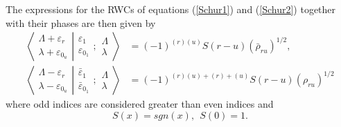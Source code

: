 \documentclass[12pt]{article}
\begin{document}
The expressions for the RWCs of equations (\ref{Schur1}) and (\ref{Schur2}) together with their phases \cite{GIW2,GIW3} are then given by
\begin{align*}
\left\langle\left. 
\begin{array}{c} \Lambda+\varepsilon_r\\ \lambda+\varepsilon_{0_u} 
 \end{array}
\right|\right.
\left.
\begin{array}{c} \varepsilon_1 \\ \varepsilon_{0_1} 
 \end{array}
; \begin{array}{c} \Lambda \\ \lambda
 \end{array}
\right\rangle &= (-1)^{(r)(u)} S(r-u) (\bar{\rho}_{ru})^{1/2}
,\\
\left\langle\left. 
\begin{array}{c} \Lambda-\varepsilon_r\\ \lambda-\varepsilon_{0_u} 
 \end{array}
\right|\right.
\left.
\begin{array}{c} \bar{\varepsilon}_1 \\ \bar{\varepsilon}_{0_1} 
 \end{array}
; \begin{array}{c} \Lambda \\ \lambda
 \end{array}
\right\rangle &= (-1)^{(r)(u) +(r) + (u)} S(r-u) ({\rho_{ru}})^{1/2}
\end{align*}
where odd indices are considered greater than even indices and
$$
S(x) = sgn(x),~~S(0)=1.
$$
\end{document}
